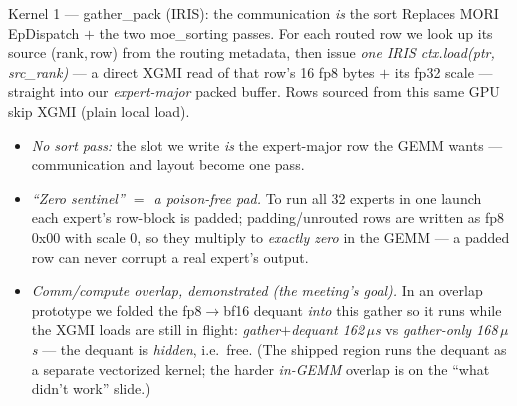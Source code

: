 \documentclass[pdf,aspectratio=169]{beamer}
\newcommand{\empy}[1]{{\color{darkorange}\emph{#1}}}
\newcommand{\empr}[1]{{\color{cardinalred}\emph{#1}}}
\newcommand{\mc}[1]{{\ttfamily\small #1}}
\begin{document}
\begin{frame}{Kernel 1 --- \mc{gather\_pack} (IRIS): the communication \emph{is} the sort}
\footnotesize
Replaces MORI \mc{EpDispatch} $+$ the two \mc{moe\_sorting} passes. For each routed row we look up its source \mc{(rank,\,row)} from the routing metadata, then issue \empy{one IRIS \mc{ctx.load(ptr, src\_rank)}} --- a direct XGMI read of that row's 16 fp8 bytes $+$ its fp32 scale --- straight into our \emph{expert-major} packed buffer. Rows sourced from this same GPU skip XGMI (plain local load).
\begin{itemize}\footnotesize
  \item \empr{No sort pass:} the slot we write \emph{is} the expert-major row the GEMM wants --- communication and layout become one pass.
  \item \empr{``Zero sentinel'' $=$ a poison-free pad.} To run all 32 experts in one launch each expert's row-block is padded; padding/unrouted rows are written as fp8 \mc{0x00} with scale \mc{0}, so they multiply to \empy{exactly zero} in the GEMM --- a padded row can never corrupt a real expert's output.
  \item \empy{Comm/compute overlap, demonstrated (the meeting's goal).} In an overlap prototype we folded the fp8$\to$bf16 dequant \emph{into} this gather so it runs while the XGMI loads are still in flight: \empr{gather$+$dequant 162\,$\mu$s} vs \empr{gather-only 168\,$\mu$s} --- the dequant is \emph{hidden}, i.e.\ free. (The shipped region runs the dequant as a separate vectorized kernel; the harder \emph{in-GEMM} overlap is on the ``what didn't work'' slide.)
\end{itemize}
\end{frame}
\end{document}
